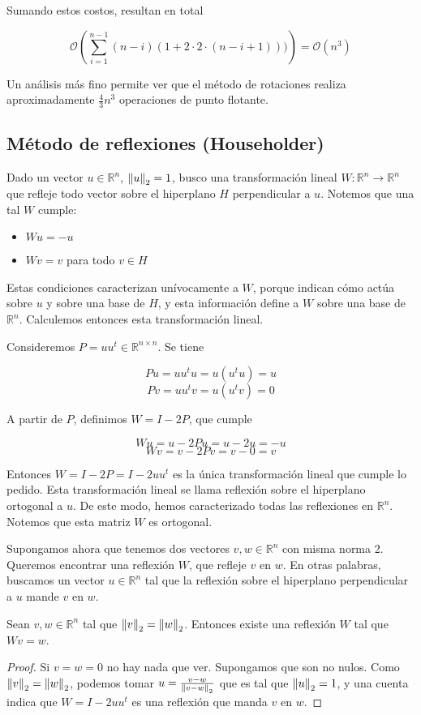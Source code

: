 Sumando estos costos, resultan en total

\[\mathcal{O}\left(\sum_{i = 1}^{n - 1}(n - i)(1 + 2\cdot 2 \cdot (n - i + 1)))\right) = \mathcal{O}(n^3)\]

Un análisis más fino permite ver que el método de rotaciones realiza aproximadamente $\frac{4}{3}n^3$ operaciones de punto flotante.

\subsection{Método de reflexiones (Householder)}

Dado un vector $u \in \mathbb{R}^n$, $\left\lVert u\right\rVert_2 = 1$, busco una transformación lineal $W : \mathbb{R}^n \to \mathbb{R}^n$ que refleje todo vector sobre el hiperplano $H$ perpendicular a $u$. Notemos que una tal $W$ cumple:

\begin{itemize}
\item $Wu = -u$
\item $Wv = v$ para todo $v \in H$
\end{itemize}

Estas condiciones caracterizan unívocamente a $W$, porque indican cómo actúa sobre $u$ y sobre una base de $H$, y esta información define a $W$ sobre una base de $\mathbb{R}^n$. Calculemos entonces esta transformación lineal.

Consideremos $P = uu^t \in \mathbb{R}^{n \times n}$. Se tiene

\[Pu = uu^tu = u(u^tu) = u\]
\[Pv = uu^tv = u(u^tv) = 0\]

A partir de $P$, definimos $W = I - 2P$, que cumple

\[Wu = u - 2Pu = u - 2u = -u\]
\[Wv = v - 2Pv = v - 0 = v\]

Entonces $W = I - 2P = I - 2uu^t$ es la única transformación lineal que cumple lo pedido. Esta transformación lineal se llama reflexión sobre el hiperplano ortogonal a $u$. De este modo, hemos caracterizado todas las reflexiones en $\mathbb{R}^n$. Notemos que esta matriz $W$ es ortogonal.

Supongamos ahora que tenemos dos vectores $v, w \in \mathbb{R}^n$ con misma norma 2. Queremos encontrar una reflexión $W$, que refleje $v$ en $w$. En otras palabras, buscamos un vector $u \in \mathbb{R}^n$ tal que la reflexión sobre el hiperplano perpendicular a $u$ mande $v$ en $w$.

\begin{propo}
Sean $v, w \in \mathbb{R}^n$ tal que $\left\lVert v\right\rVert_2 = \left\lVert w\right\rVert_2$. Entonces existe una reflexión $W$ tal que $Wv = w$.

\begin{proof}
Si $v = w = 0$ no hay nada que ver. Supongamos que son no nulos. Como $\left\lVert v\right\rVert_2 = \left\lVert w\right\rVert_2$, podemos tomar $u = \frac{v - w}{\left\lVert v - w\right\rVert_2}$ que es tal que $\left\lVert u\right\rVert_2 = 1$, y una cuenta indica que $W = I - 2uu^t$ es una reflexión que manda $v$ en $w$.
\end{proof}
\end{propo}

